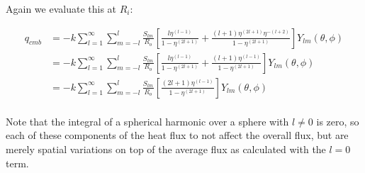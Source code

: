 \documentclass[a4paper,10pt]{article}
\begin{document}
Again we evaluate this at $R_i$:

\begin{equation}
\begin{aligned}
q_{cmb} &= -k  \displaystyle \sum_{l=1}^{\infty} \sum_{m=-l}^{l} \frac{S_{lm}}{R_o} \left[ \frac{l \eta^{(l-1)}}{1-\eta^{(2l+1)}} +  \frac{(l+1) \eta^{(2l+1)} \eta^{-(l+2)}}{1-\eta^{(2l+1)}} \right] Y_{lm}(\theta,\phi) \\
&= -k \displaystyle \sum_{l=1}^{\infty} \sum_{m=-l}^{l} \frac{S_{lm}}{R_o} \left[ \frac{l \eta^{(l-1)}}{1-\eta^{(2l+1)}} +  \frac{(l+1) \eta^{(l-1)} }{1-\eta^{(2l+1)}} \right] Y_{lm}(\theta,\phi) \\
&= -k \displaystyle \sum_{l=1}^{\infty} \sum_{m=-l}^{l} \frac{S_{lm}}{R_o} \left[ \frac{(2l+1) \eta^{(l-1)}}{1-\eta^{(2l+1)}} \right] Y_{lm}(\theta,\phi) \\
\end{aligned}
\end{equation}

Note that the integral of a spherical harmonic over a sphere with $l \ne 0$ is zero, so each of these components of the heat flux to not affect the overall flux, but are merely spatial variations on top of the average flux as calculated with the $l = 0$ term.
\end{document}
